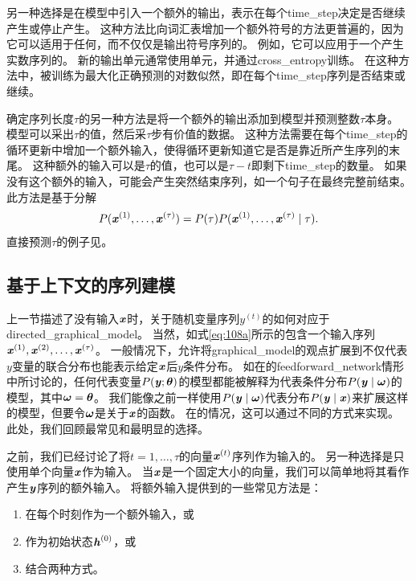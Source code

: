 
另一种选择是在模型中引入一个额外的输出，表示在每个\gls{time_step}决定是否继续产生或停止产生。
这种方法比向词汇表增加一个额外符号的方法更普遍的，因为它可以适用于任何，而不仅仅是输出符号序列的。
例如，它可以应用于一个产生实数序列的。
新的输出单元通常使用单元，并通过\gls{cross_entropy}训练。
在这种方法中，被训练为最大化正确预测的对数似然，即在每个\gls{time_step}序列是否结束或继续。

确定序列长度$\tau$的另一种方法是将一个额外的输出添加到模型并预测整数$\tau$本身。
模型可以采出$\tau$的值，然后采$\tau$步有价值的数据。
这种方法需要在每个\gls{time_step}的循环更新中增加一个额外输入，使得循环更新知道它是否是靠近所产生序列的末尾。
这种额外的输入可以是$\tau$的值，也可以是$\tau - t$即剩下\gls{time_step}的数量。
如果没有这个额外的输入，可能会产生突然结束序列，如一个句子在最终完整前结束。
此方法是基于分解
\begin{align}
 P(\boldsymbol{\mathit{x}}^{(1)},\dots, \boldsymbol{\mathit{x}}^{(\tau)}) = P(\tau) P(\boldsymbol{\mathit{x}}^{(1)},\dots,\boldsymbol{\mathit{x}}^{(\tau)} \mid \tau) .
\end{align}
直接预测$\tau$的例子见\cite{Goodfellow+et+al-ICLR2014a}。

\subsection{基于上下文的序列建模}
\label{sec:modeling_sequences_conditioned_on_context_with_rnns}
上一节描述了没有输入$\boldsymbol{\mathit{x}}$时，关于随机变量序列$y^{(t)}$的如何对应于\gls{directed_graphical_model}。
当然，如式\eqref{eq:108a}所示的包含一个输入序列$\boldsymbol{\mathit{x}}^{(1)},\boldsymbol{\mathit{x}}^{(2)},\dots,\boldsymbol{\mathit{x}}^{(\tau)}$。
一般情况下，允许将\gls{graphical_model}的观点扩展到不仅代表$y$变量的联合分布也能表示给定$\boldsymbol{\mathit{x}}$后$y$条件分布。
如在的\gls{feedforward_network}情形中所讨论的，任何代表变量$P(\boldsymbol{\mathit{y}};\boldsymbol{\theta})$的模型都能被解释为代表条件分布$P(\boldsymbol{\mathit{y}} \mid \boldsymbol{\omega})$的模型，其中$\boldsymbol{\omega}=\boldsymbol{\theta}$。
我们能像之前一样使用$P(\boldsymbol{\mathit{y}} \mid \boldsymbol{\omega})$代表分布$P(\boldsymbol{\mathit{y}} \mid \boldsymbol{\mathit{x}})$来扩展这样的模型，但要令$\boldsymbol{\omega}$是关于$\boldsymbol{\mathit{x}}$的函数。
在的情况，这可以通过不同的方式来实现。
此处，我们回顾最常见和最明显的选择。


之前，我们已经讨论了将$t =1, \dots, \tau$的向量$\boldsymbol{\mathit{x}}^{(t)}$序列作为输入的。
另一种选择是只使用单个向量$\boldsymbol{\mathit{x}}$作为输入。
当$\boldsymbol{\mathit{x}}$是一个固定大小的向量，我们可以简单地将其看作产生$\boldsymbol{\mathit{y}}$序列的额外输入。
将额外输入提供到的一些常见方法是：
\begin{enumerate}
 \item 在每个时刻作为一个额外输入，或
 \item 作为初始状态$\boldsymbol{\mathit{h}}^{(0)}$，或
 \item 结合两种方式。
\end{enumerate}

